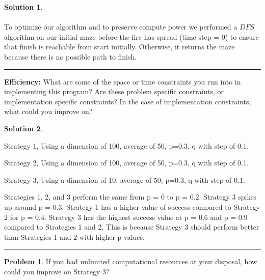 \documentclass{article}
\theoremstyle{definition}
\newtheorem{problem}{Problem}
\def\fline{\rule{0.75\linewidth}{0.5pt}}
\newcommand{\finishline}{\vspace{-15pt}\begin{center}\fline\end{center}}
\newtheorem*{solution*}{Solution}
\newenvironment{solution}{\begin{solution*}}{{\finishline} \end{solution*}}
\begin{document}
\begin{solution}
	\\\\
	To optimize our algorithm and to preserve compute power we performed a $DFS$ algorithm on our initial maze before the fire has spread (time step = 0) to ensure that finish is reachable from start initially. Otherwise, it returns the maze because there is no possible path to finish.
	
\end{solution}

\smallskip

\textbf{Efficiency: }
What are some of the space or time constraints you run into in implementing this program? 
Are these problem specific constraints, or implementation specific constraints? 
In the case of implementation constraints, what could you improve on?


\smallskip

\begin{solution} \hfill
    \begin{figure}[h]
	\centering
	\caption{} 
	\end{figure} 
	\begin{center}
	Strategy 1, Using a dimension of 100, average of 50, p=0.3, q with step of 0.1.
	
	Strategy 2, Using a dimension of 100, average of 50, p=0.3, q with step of 0.1.
	
	Strategy 3, Using a dimension of 10, average of 50, p=0.3, q with step of 0.1. 
    \end{center}
    
    Strategies 1, 2, and 3 perform the same from p = 0 to p = 0.2. Strategy 3 spikes up around p = 0.3. Strategy 1 has a higher value of success compared to Strategy 2 for p = 0.4. Strategy 3 has the highest success value at p = 0.6 and p = 0.9 compared to Strategies 1 and 2. This is because Strategy 3 should perform better than Strategies 1 and 2 with higher p values.
\end{solution}
\smallskip
\begin{problem}
	If you had unlimited computational resources at your disposal, how could you improve on Strategy 3? 
\end{problem}

\smallskip
\end{document}
